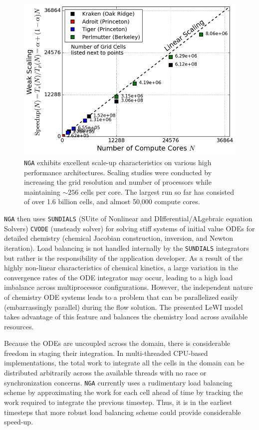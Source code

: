 \documentclass[letterpaper,twocolumn,10pt]{article}
\begin{document}
\begin{figure}[h!]
    \centering
    \includegraphics[width=1.03\linewidth]{Figures/NGA_scaling.PNG}
    \caption{\texttt{NGA} exhibits excellent scale-up characteristics on various high performance architectures. Scaling studies were conducted by increasing the grid resolution and number of processors while maintaining $\sim 256$ cells per core. The largest run so far has consisted of over 1.6 billion cells, and almost 50,000 compute cores.}
    \label{fig:Scaleup2}
\end{figure}

\texttt{NGA} then uses \texttt{SUNDIALS} \cite{SUNDIALS} (SUite of Nonlinear and DIfferential/ALgebraic equation Solvers) \texttt{CVODE} (unsteady solver) for solving stiff systems of initial value ODEs for detailed chemistry (chemical Jacobian construction, inversion, and Newton iteration). Load balancing is not handled internally by the \texttt{SUNDIALS} integrators but rather is the responsibility of the application developer. As a result of the highly non-linear characteristics of chemical kinetics, a large variation in the convergence rates of the ODE integrator may occur, leading to a high load imbalance across multiprocessor configurations. However, the independent nature of chemistry ODE systems leads to a problem that can be parallelized easily (embarrassingly parallel) during the flow solution. The presented LeWI model takes advantage of this feature and balances the chemistry load across available resources.

Because the ODEs are uncoupled across the domain, there is considerable freedom in staging their integration. In multi-threaded CPU-based implementations, the total work to integrate all the cells in the domain can be distributed arbitrarily across the available threads with no race or synchronization concerns. \texttt{NGA} currently uses a rudimentary load balancing scheme by approximating the work for each cell ahead of time by tracking the work required to integrate the previous timestep. Thus, it is in the earliest timesteps that more robust load balancing scheme could provide considerable speed-up.
\end{document}
